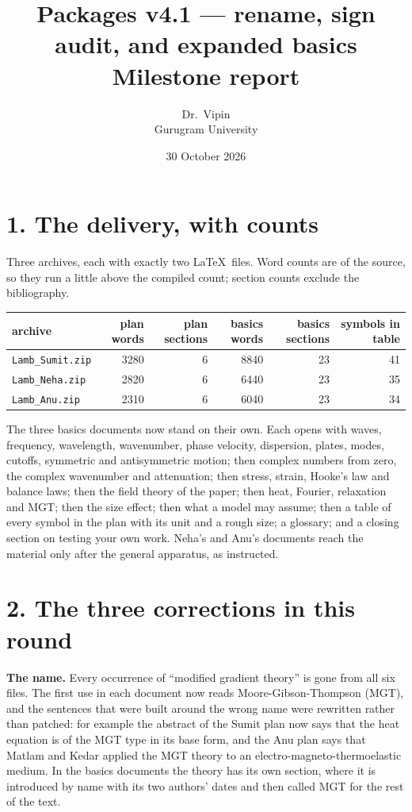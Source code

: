 \documentclass[11pt]{article}
\title{\vspace{-1.5cm}\textbf{Packages v4.1 --- rename, sign audit, and expanded basics}\\[2pt]
\large Milestone report}
\author{Dr.\ Vipin \\ Gurugram University}
\date{30 October 2026}
\begin{document}
\maketitle
\vspace{-8mm}
\footnotesize

\section*{1. The delivery, with counts}

Three archives, each with exactly two \LaTeX\ files. Word counts are of the source, so they run a little
above the compiled count; section counts exclude the bibliography.

\begin{center}\footnotesize
\begin{tabular}{lrrrrr}
\toprule
archive & plan words & plan sections & basics words & basics sections & symbols in table\\
\midrule
\texttt{Lamb\_Sumit.zip} & 3280 & 6 & 8840 & 23 & 41\\
\texttt{Lamb\_Neha.zip} & 2820 & 6 & 6440 & 23 & 35\\
\texttt{Lamb\_Anu.zip} & 2310 & 6 & 6040 & 23 & 34\\
\bottomrule
\end{tabular}
\end{center}

The three basics documents now stand on their own. Each opens with waves, frequency, wavelength, wavenumber,
phase velocity, dispersion, plates, modes, cutoffs, symmetric and antisymmetric motion; then complex numbers
from zero, the complex wavenumber and attenuation; then stress, strain, Hooke's law and balance laws; then the
field theory of the paper; then heat, Fourier, relaxation and MGT; then the size effect; then what a model may
assume; then a table of every symbol in the plan with its unit and a rough size; a glossary; and a closing
section on testing your own work. Neha's and Anu's documents reach the material only after the general
apparatus, as instructed.

\section*{2. The three corrections in this round}

\textbf{The name.} Every occurrence of ``modified gradient theory'' is gone from all six files. The first use
in each document now reads Moore-Gibson-Thompson (MGT), and the sentences that were built around the wrong
name were rewritten rather than patched: for example the abstract of the Sumit plan now says that the heat
equation is of the MGT type in its base form, and the Anu plan says that Matlam and Kedar applied the MGT
theory to an electro-magneto-thermoelastic medium. In the basics documents the theory has its own section,
where it is introduced by name with its two authors' dates and then called MGT for the rest of the text.
\end{document}
